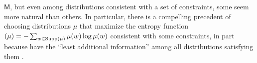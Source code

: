 \documentclass{article}
\theoremstyle{plain}
\theoremstyle{definition}
\theoremstyle{remark}
\let\H\relax
\DeclareMathOperator{\H}{\mathrm{H}} %
\newcommand{\sfM}{\mathsf M}
\numberwithin{equation}{section}
\begin{document}
		$\sfM$, but even among distributions consistent with a set of
        constraints, some seem more natural than others.
	In particular, there is a compelling precedent of
choosing distributions $\mu$ that maximize the entropy function
        $\H(\mu) = -\sum_{w \in \text{Supp($\mu$)}} \mu(w) \log \mu(w)$
consistent with some constraints,
	in part because have the ``least additional information''
        among all distributions satisfying 
		them
        \cite{jaynes1957information}. 
\end{document}
